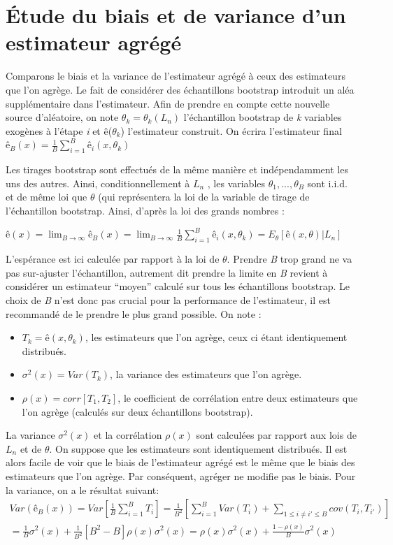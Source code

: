 	
	\section{Étude du biais et de variance d'un estimateur agrégé \cite{ESL}}
	\begin{small}
	Comparons le biais et la variance de l’estimateur agrégé à ceux des estimateurs que l’on agrège.
	Le fait de considérer des échantillons bootstrap introduit un aléa supplémentaire dans l’estimateur. Afin de prendre en compte cette nouvelle source d’aléatoire, on note $\theta_k = \theta_k(L_n)$ l’échantillon bootstrap de \textit{k} variables exogènes à l’étape \textit{i} et ê($\theta_k$) l’estimateur construit. On écrira l'estimateur final ${ê_B(x) =  \frac{1}{B} \sum_{i=1}^{B} ê_i(x,\theta_k)}$
	\par
	Les tirages bootstrap sont effectués de la même manière et indépendamment les uns des autres.
	Ainsi, conditionnellement à $L_n$ , les variables $\theta_1,..., \theta_B$ sont i.i.d. et de même loi que $\theta$ (qui représentera la loi de la variable de tirage de l’échantillon bootstrap. Ainsi, d’après la loi des grands nombres :
	\begin{center}
		${ê(x) = \lim_{B \to \infty} ê_B(x) = \lim_{B \to \infty} \frac{1}{B} \sum_{i=1}^{B} ê_i(x,\theta_k) = E_\theta[ê(x,\theta) | L_n]  }$
	\end{center}
	L’espérance est ici calculée par rapport à la loi de $\theta$. Prendre \textit{B} trop grand ne va pas sur-ajuster l’échantillon, autrement dit prendre la limite en \textit{B} revient à considérer un estimateur “moyen” calculé sur tous les échantillons bootstrap. Le choix de \textit{B} n’est donc pas crucial pour la performance de l’estimateur, il est recommandé de le prendre le plus grand possible. On note :
	\begin{itemize}
	\item ${T_k=ê(x,\theta_k)}$, les estimateurs que l'on agrège, ceux ci étant identiquement distribués.
	\item ${\sigma^2(x) = Var (T_k)}$, la variance des estimateurs que l'on agrège.
	\item ${\rho(x) = corr[T_1,T_2]}$, le coefficient de corrélation entre deux estimateurs que l’on agrège (calculés sur deux échantillons bootstrap).
	\end{itemize}
	La variance ${\sigma^2(x)}$ et la corrélation ${\rho(x)}$ sont calculées par rapport aux lois de \textit{$L_n$} et de $\theta$. On suppose que les estimateurs sont identiquement distribués. Il est alors facile de voir que le biais
	de l’estimateur agrégé est le même que le biais des estimateurs que l’on agrège. Par conséquent,
	agréger ne modifie pas le biais. Pour la variance, on a le résultat suivant:
	\begin{equation*}
	\begin{split}	
	Var(ê_B(x)) = Var [ \frac{1}{B} \sum_{i=1}^{B} T_i] = \frac{1}{B^2} [\sum_{i=1}^{B} Var(T_i) + \sum_{1 \leq i \neq i' \leq B} cov(T_i,T_{i'}) ] \\ = \frac{1}{B}\sigma^2(x) + \frac{1}{B^2}[B^2-B]\rho(x)\sigma^2(x) = \rho(x)\sigma^2(x) + \frac{1-\rho(x)}{B}\sigma^2(x)
	\end{split}
	\end{equation*}


\end{small}
